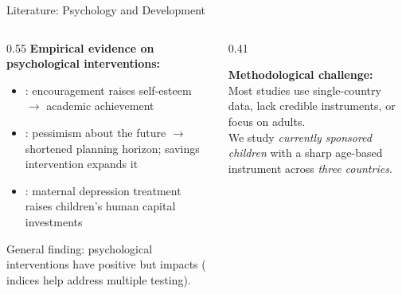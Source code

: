 \documentclass[aspectratio=169, 10pt]{beamer}
\begin{document}
\begin{frame}{Literature: Psychology and Development}
  \begin{columns}
    \begin{column}{0.55\textwidth}
      \textbf{Empirical evidence on psychological interventions:}
      \begin{itemize}
        \item \citealt{Benabou2003}: encouragement raises self-esteem $\to$ academic achievement
        \item \citealt{Laajaj2017}: pessimism about the future $\to$ shortened planning horizon; savings intervention expands it
        \item \citealt{Baranov2020}: maternal depression treatment raises children's human capital investments
      \end{itemize}
      \vspace{0.5em}
      General finding: psychological interventions have positive but  impacts (\citealt{Anderson2008} indices help address multiple testing).
    \end{column}
    \begin{column}{0.41\textwidth}
      \begin{methodbox}
        \textbf{Methodological challenge:}\\[0.4em]
        Most studies use single-country data, lack credible instruments, or focus on adults.\\[0.5em]
        We study \emph{currently sponsored children} with a sharp age-based instrument across \emph{three countries}.
      \end{methodbox}
    \end{column}
  \end{columns}
\end{frame}
\end{document}
